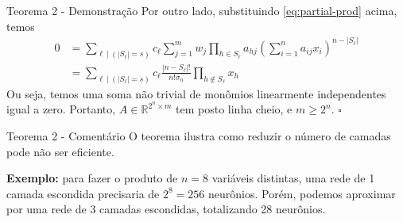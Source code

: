 \documentclass{beamer}
\begin{document}
\begin{frame}{Teorema 2 - Demonstração}
    Por outro lado, substituindo \eqref{eq:partial-prod} acima, temos
    \begin{align*}
        0 &= \sum_{\ell \ | \ (|S_{\ell}| = s)} c_{\ell} \sum_{j=1}^{m} w_{j} \prod_{h \in S_{\ell}} a_{hj} \left( \sum_{i=1}^{n} a_{ij} x_{i} \right)^{n - |S_{\ell}|}\\
        &= \sum_{\ell \ | \ (|S_{\ell}| = s)} c_{\ell} \frac{|n-S_\ell|!}{n!\sigma_n} \prod_{h \notin S_\ell} x_h         
    \end{align*}
    \pause
    Ou seja, temos uma soma não trivial de monômios linearmente independentes igual a zero. Portanto, $A \in \mathbb R^{2^n \times m}$ tem posto linha cheio, e $m \geq 2^n$. $\square$
\end{frame}

\begin{frame}{Teorema 2 - Comentário}
    O teorema ilustra como reduzir o número de camadas pode não ser eficiente. 
    \vspace{1em}
    
    \textbf{Exemplo:} para fazer o produto de $n=8$ variáveis distintas, uma rede de 1 camada escondida precisaria de $2^8=256$ neurônios. Porém, podemos aproximar por uma rede de 3 camadas escondidas, totalizando 28 neurônios.
\end{frame}



    
    
\end{document}
